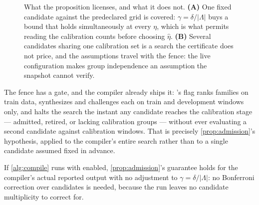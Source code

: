 \begin{figure}[t]
  \centering
  
  \caption{What the proposition licenses, and what it does not.  \textbf{(A)} One fixed
  candidate against the predeclared grid is covered: $\gamma=\delta/|\Lambda|$ buys a
  bound that holds simultaneously at every $\eta$, which is what permits reading the
  calibration counts before choosing $\hat\eta$.  \textbf{(B)} Several candidates sharing
  one calibration set is a search the certificate does not price, and the assumptions
  travel with the fence: the live configuration makes group independence an assumption
  the snapshot cannot verify.}
  \label{fig:scope-fence}
\end{figure}

The fence has a gate, and the compiler already ships it: 's
 flag ranks families on train data,
synthesizes and challenges each on train and development windows only, and halts the
search the instant any candidate reaches the calibration stage --- admitted, retired, or
lacking calibration groups --- without ever evaluating a second candidate against
calibration windows.  That is precisely \cref{prop:admission}'s hypothesis, applied to the
compiler's entire search rather than to a single candidate assumed fixed in advance.

\begin{corollary}
\label{cor:frozen}
\small
If \cref{alg:compile} runs with  enabled,
\cref{prop:admission}'s guarantee holds for the compiler's actual reported output with no
adjustment to $\gamma=\delta/|\Lambda|$: no Bonferroni correction over candidates is
needed, because the run leaves no candidate multiplicity to correct for.
\end{corollary}

